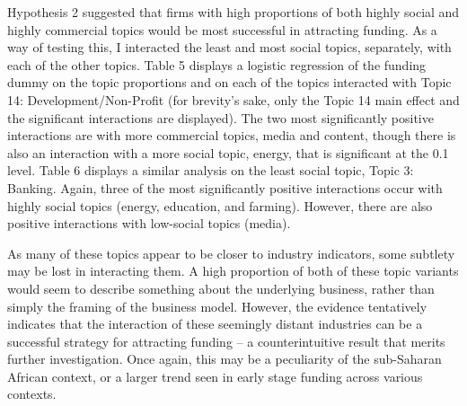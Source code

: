 \documentclass[12pt]{article}
\begin{document}
Hypothesis 2 suggested that firms with high proportions of both highly social and highly commercial topics would be most successful in attracting funding. As a way of testing this, I interacted the least and most social topics, separately, with each of the other topics. Table 5 displays a logistic regression of the funding dummy on the topic proportions and on each of the topics interacted with Topic 14: Development/Non-Profit (for brevity's sake, only the Topic 14 main effect and the significant interactions are displayed). The two most significantly positive interactions are with more commercial topics, media and content, though there is also an interaction with a more social topic, energy, that is significant at the 0.1 level. Table 6 displays a similar analysis on the least social topic, Topic 3: Banking. Again, three of the most significantly positive interactions occur with highly social topics (energy, education, and farming). However, there are also positive interactions with low-social topics (media). 

As many of these topics appear to be closer to industry indicators, some subtlety may be lost in interacting them. A high proportion of both of these topic variants would seem to describe something about the underlying business, rather than simply the framing of the business model. However, the evidence tentatively indicates that the interaction of these seemingly distant industries can be a successful strategy for attracting funding -- a counterintuitive result that merits further investigation. Once again, this may be a peculiarity of the sub-Saharan African context, or a larger trend seen in early stage funding across various contexts. 
\end{document}
